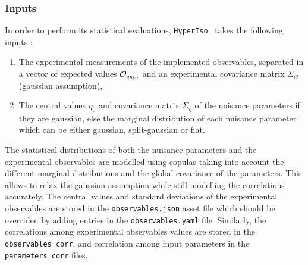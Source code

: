 \documentclass[preprint,11pt]{elsarticle}
\newcommand{\hi}{\texttt{HyperIso}}
\begin{document}
\subsubsection{Inputs}
In order to perform its statistical evaluations, \hi~ takes the following inputs :
\begin{enumerate}
    \item The experimental measurements of the implemented observables, separated in a vector of expected values $\mathcal{O}_{\rm exp.}$ and an experimental covariance matrix $\Sigma_\mathcal{O}$ (gaussian assumption),
    \item The central values $\eta_0$ and covariance matrix $\Sigma_\eta$ of the nuisance parameters if they are gaussian, else the marginal distribution of each nuisance parameter which can be either gaussian, split-gaussian or flat.
\end{enumerate}
The statistical distributions of both the nuisance parameters and the experimental observables are modelled using copulas taking into account the different marginal distributions and the global covariance of the parameters. This allows to relax the gaussian assumption while still modelling the correlations accurately. The central values and standard deviations of the experimental observables are stored in the \texttt{observables.json} asset file which should be overriden by adding entries in the \texttt{observables.yaml} file. Similarly, the correlations among experimental observables values are stored in the \texttt{observables\_corr}, and correlation among input parameters in the \texttt{parameters\_corr} files.
\end{document}
